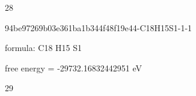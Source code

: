 \documentclass{article}
\begin{document}
28

\vspace{1cm}


94be97269b03e361ba1b344f48f19e44-C18H15S1-1-1



formula: C18 H15 S1



free energy = -29732.16832442951 eV

29
\end{document}
